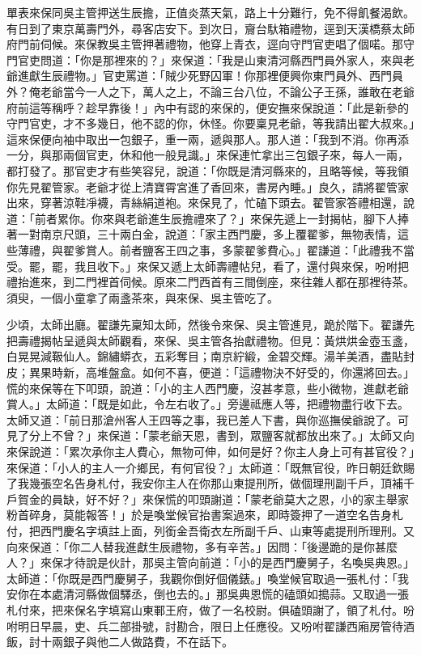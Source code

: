 單表來保同吳主管押送生辰擔，正值炎蒸天氣，路上十分難行，免不得飢餐渴飲。有日到了東京萬壽門外，尋客店安下。到次日，齎台馱箱禮物，逕到天漢橋蔡太師府門前伺候。來保教吳主管押著禮物，他穿上青衣，逕向守門官吏唱了個喏。那守門官吏問道：「你是那裡來的？」來保道：「我是山東清河縣西門員外家人，來與老爺進獻生辰禮物。」官吏罵道：「賊少死野囚軍！你那裡便興你東門員外、西門員外？俺老爺當今一人之下，萬人之上，不論三台八位，不論公子王孫，誰敢在老爺府前這等稱呼？趁早靠後！」內中有認的來保的，便安撫來保說道：「此是新參的守門官吏，才不多幾日，他不認的你，休怪。你要稟見老爺，等我請出翟大叔來。」這來保便向袖中取出一包銀子，重一兩，遞與那人。那人道：「我到不消。你再添一分，與那兩個官吏，休和他一般見識。」來保連忙拿出三包銀子來，每人一兩，都打發了。那官吏才有些笑容兒，說道：「你既是清河縣來的，且略等候，等我領你先見翟管家。老爺才從上清寶霄宮進了香回來，書房內睡。」良久，請將翟管家出來，穿著涼鞋凈襪，青絲絹道袍。來保見了，忙磕下頭去。翟管家答禮相還，說道：「前者累你。你來與老爺進生辰擔禮來了？」來保先遞上一封揭帖，腳下人捧著一對南京尺頭，三十兩白金，說道：「家主西門慶，多上覆翟爹，無物表情，這些薄禮，與翟爹賞人。前者鹽客王四之事，多蒙翟爹費心。」翟謙道：「此禮我不當受。罷，罷，我且收下。」來保又遞上太師壽禮帖兒，看了，還付與來保，吩咐把禮抬進來，到二門裡首伺候。原來二門西首有三間倒座，來往雜人都在那裡待茶。須臾，一個小童拿了兩盞茶來，與來保、吳主管吃了。

少頃，太師出廳。翟謙先稟知太師，然後令來保、吳主管進見，跪於階下。翟謙先把壽禮揭帖呈遞與太師觀看，來保、吳主管各抬獻禮物。但見：黃烘烘金壺玉盞，白晃晃減靸仙人。錦繡蟒衣，五彩奪目；南京紵緞，金碧交輝。湯羊美酒，盡貼封皮；異果時新，高堆盤盒。如何不喜，便道：「這禮物決不好受的，你還將回去。」慌的來保等在下叩頭，說道：「小的主人西門慶，沒甚孝意，些小微物，進獻老爺賞人。」太師道：「既是如此，令左右收了。」旁邊祗應人等，把禮物盡行收下去。太師又道：「前日那滄州客人王四等之事，我已差人下書，與你巡撫侯爺說了。可見了分上不曾？」來保道：「蒙老爺天恩，書到，眾鹽客就都放出來了。」太師又向來保說道：「累次承你主人費心，無物可伸，如何是好？你主人身上可有甚官役？」來保道：「小人的主人一介鄉民，有何官役？」太師道：「既無官役，昨日朝廷欽賜了我幾張空名告身札付，我安你主人在你那山東提刑所，做個理刑副千戶，頂補千戶賀金的員缺，好不好？」來保慌的叩頭謝道：「蒙老爺莫大之恩，小的家主舉家粉首碎身，莫能報答！」於是喚堂候官抬書案過來，即時簽押了一道空名告身札付，把西門慶名字填註上面，列銜金吾衛衣左所副千戶、山東等處提刑所理刑。又向來保道：「你二人替我進獻生辰禮物，多有辛苦。」因問：「後邊跪的是你甚麼人？」來保才待說是伙計，那吳主管向前道：「小的是西門慶舅子，名喚吳典恩。」太師道：「你既是西門慶舅子，我觀你倒好個儀錶。」喚堂候官取過一張札付：「我安你在本處清河縣做個驛丞，倒也去的。」那吳典恩慌的磕頭如搗蒜。又取過一張札付來，把來保名字填寫山東鄆王府，做了一名校尉。俱磕頭謝了，領了札付。吩咐明日早晨，吏、兵二部掛號，討勘合，限日上任應役。又吩咐翟謙西廂房管待酒飯，討十兩銀子與他二人做路費，不在話下。

